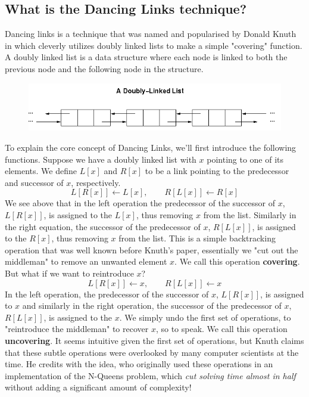 \documentclass{article}
\begin{document}
\subsection{What is the Dancing Links technique?}
Dancing links is a technique that was named and popularised by Donald Knuth in \cite{dlx} which cleverly utilizes doubly linked lists to make a simple "covering" function. A doubly linked list is a data structure where each node is linked to both the previous node and the following node in the structure.

\begin{center}
\begin{figure}[ht]
\includegraphics[scale=0.75]{images/linkedlist.png}
\label{fig: The Ranks and Files of a 4x4 Board}
\end{figure}
\end{center}
 To explain the core concept of Dancing Links, we'll first introduce the following functions. Suppose we have a doubly linked list with $x$ pointing to one of its elements. We define $L[x]$ and $R[x]$ to be a link pointing to the predecessor and successor of $x$, respectively. 
$$L[R[x]] \leftarrow L[x], \quad \quad R[L[x]] \leftarrow R[x]$$
We see above that in the left operation the predecessor of the successor of $x$, $L[R[x]]$, is assigned to the $L[x]$, thus removing $x$ from the list. Similarly in the right equation, the successor of the predecessor of $x$, $R[L[x]]$, is assigned to the $R[x]$, thus removing $x$ from the list. This is a simple backtracking operation that was well known before Knuth's paper, essentially we "cut out the middleman" to remove an unwanted element $x$. We call this operation \textbf{covering}. But what if we want to reintroduce $x$?
$$L[R[x]] \leftarrow x ,\quad \quad R[L[x]] \leftarrow x$$
In the left operation, the predecessor of the successor of $x$, $L[R[x]]$, is assigned to $x$ and similarly in the right operation, the successor of the predecessor of $x$, $R[L[x]]$, is assigned to the $x$. We simply undo the first set of operations, to "reintroduce the middleman" to recover $x$, so to speak. We call this operation \textbf{uncovering}. It seems intuitive given the first set of operations, but Knuth claims that these subtle operations were overlooked by many computer scientists at the time. He credits \cite{first} with the idea, who originally used these operations in an implementation of the N-Queens problem, which \textit{cut solving time almost in half} without adding a significant amount of complexity!
\end{document}
